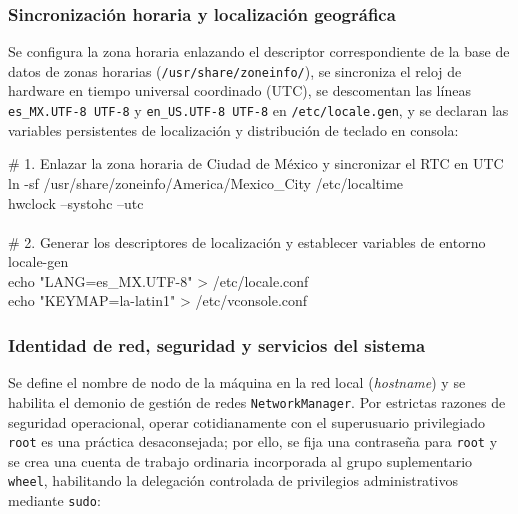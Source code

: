 \documentclass[12pt]{article}
\begin{document}
\subsubsection{Sincronización horaria y localización geográfica}

Se configura la zona horaria enlazando el descriptor correspondiente de la base de datos de zonas horarias (\texttt{/usr/share/zoneinfo/}), se sincroniza el reloj de hardware en tiempo universal coordinado (UTC), se descomentan las líneas \texttt{es\_MX.UTF-8 UTF-8} y \texttt{en\_US.UTF-8 UTF-8} en \texttt{/etc/locale.gen}, y se declaran las variables persistentes de localización y distribución de teclado en consola:

\begin{mdframed}[style=terminal]
\ttfamily\upshape\color{bashLetterColor}\footnotesize
\# 1. Enlazar la zona horaria de Ciudad de México y sincronizar el RTC en UTC \\
ln -sf /usr/share/zoneinfo/America/Mexico\_City /etc/localtime \\
hwclock --systohc --utc \\
\\
\# 2. Generar los descriptores de localización y establecer variables de entorno \\
locale-gen \\
echo "LANG=es\_MX.UTF-8" > /etc/locale.conf \\
echo "KEYMAP=la-latin1" > /etc/vconsole.conf
\end{mdframed}

\subsubsection{Identidad de red, seguridad y servicios del sistema}

Se define el nombre de nodo de la máquina en la red local (\textit{hostname}) y se habilita el demonio de gestión de redes \texttt{NetworkManager}. Por estrictas razones de seguridad operacional, operar cotidianamente con el superusuario privilegiado \texttt{root} es una práctica desaconsejada; por ello, se fija una contraseña para \texttt{root} y se crea una cuenta de trabajo ordinaria incorporada al grupo suplementario \texttt{wheel}, habilitando la delegación controlada de privilegios administrativos mediante \texttt{sudo}:
\end{document}
